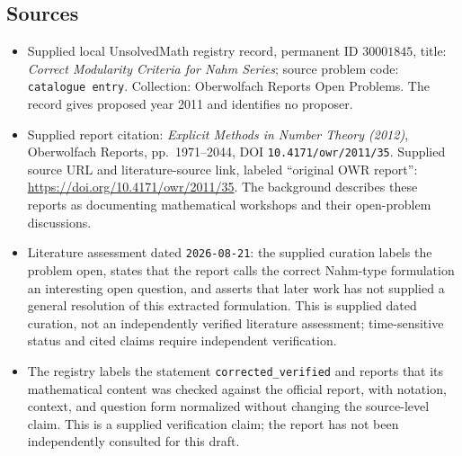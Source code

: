 \documentclass[11pt]{article}
\begin{document}
\subsection{Sources}
\begin{itemize}
\item Supplied local UnsolvedMath registry record, permanent ID \(30001845\), title: \emph{Correct Modularity Criteria for Nahm Series}; source problem code: \texttt{catalogue entry}. Collection: Oberwolfach Reports Open Problems. The record gives proposed year 2011 and identifies no proposer.
\item Supplied report citation: \emph{Explicit Methods in Number Theory (2012)}, Oberwolfach Reports, pp.~1971--2044, DOI \texttt{10.4171/owr/2011/35}. Supplied source URL and literature-source link, labeled ``original OWR report'': \url{https://doi.org/10.4171/owr/2011/35}. The background describes these reports as documenting mathematical workshops and their open-problem discussions.
\item Literature assessment dated \texttt{2026-08-21}: the supplied curation labels the problem open, states that the report calls the correct Nahm-type formulation an interesting open question, and asserts that later work has not supplied a general resolution of this extracted formulation. This is supplied dated curation, not an independently verified literature assessment; time-sensitive status and cited claims require independent verification.
\item The registry labels the statement \texttt{corrected\_verified} and reports that its mathematical content was checked against the official report, with notation, context, and question form normalized without changing the source-level claim. This is a supplied verification claim; the report has not been independently consulted for this draft.
\end{itemize}
\end{document}
